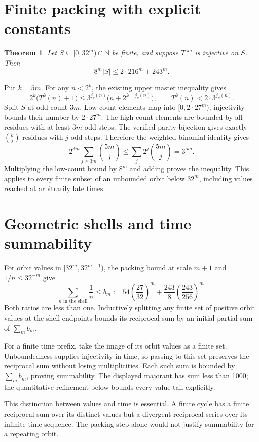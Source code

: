 \documentclass[10pt]{article}
\newtheorem{theorem}{Theorem}
\begin{document}
\section{Finite packing with explicit constants}
\begin{theorem}
Let $S\subseteq[0,32^m)\cap\mathbb N$ be finite, and suppose $T^{5m}$ is
injective on $S$. Then
\[
8^m|S|\le2\cdot216^m+243^m.
\]
\end{theorem}
Put $k=5m$. For any $n<2^k$, the existing upper master inequality gives
\[
2^k\bigl(T^k(n)+1\bigr)
 \le3^{j_k(n)}\bigl(n+2^{k-j_k(n)}\bigr),
\qquad T^k(n)<2\cdot3^{j_k(n)}.
\]
Split $S$ at odd count $3m$. Low-count elements map into
$[0,2\cdot27^m)$; injectivity bounds their number by $2\cdot27^m$.
The high-count elements are bounded by all residues with at least $3m$ odd
steps. The verified parity bijection gives exactly $\binom{k}{j}$ residues
with $j$ odd steps. Therefore the weighted binomial identity gives
\[
2^{3m}\sum_{j\ge3m}\binom{5m}{j}
\le\sum_j2^j\binom{5m}{j}=3^{5m}.
\]
Multiplying the low-count bound by $8^m$ and adding proves the inequality.
This applies to every finite subset of an unbounded orbit below $32^m$,
including values reached at arbitrarily late times.

\section{Geometric shells and time summability}
For orbit values in $[32^m,32^{m+1})$, the packing bound at scale $m+1$
and $1/n\le32^{-m}$ give
\[
\sum_{n\text{ in the shell}}\frac1n
\le b_m:=54\left(\frac{27}{32}\right)^m
 +\frac{243}{8}\left(\frac{243}{256}\right)^m.
\]
Both ratios are less than one. Inductively splitting any finite set of
positive orbit values at the shell endpoints bounds its reciprocal sum by
an initial partial sum of $\sum_m b_m$.

For a finite time prefix, take the image of its orbit values as a finite
set. Unboundedness supplies injectivity in time, so passing to this set
preserves the reciprocal sum without losing multiplicities. Each such sum
is bounded by $\sum_m b_m$, proving summability. The displayed majorant
has sum less than 1000; the quantitative refinement below bounds every
value tail explicitly.

This distinction between values and time is essential. A finite cycle has
a finite reciprocal sum over its distinct values but a divergent reciprocal
series over its infinite time sequence. The packing step alone would not
justify summability for a repeating orbit.
\end{document}
